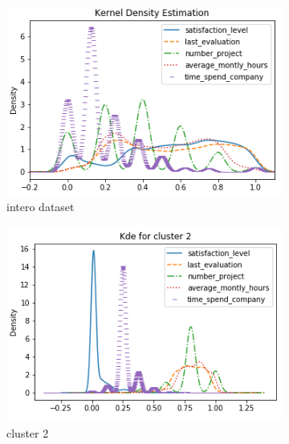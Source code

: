 \documentclass[a4paper]{article}
\begin{document}
\begin{figure}
\centering
\begin{subfigure}[b]{.33\textwidth}
  \centering
  \includegraphics[width=1\textwidth]{kde_quantitative_features.png}
  \caption{intero dataset}
  \label{fig:kde_dataset}
\end{subfigure}%
\begin{subfigure}[b]{.33\textwidth}
  \centering
  \includegraphics[width=1\textwidth]{../images/kde_within_clusters_c2.png}
  \caption{cluster 2}
  \label{fig:kde_2}
\end{subfigure}
\begin{subfigure}[b]{.33\textwidth}
  \centering

\end{subfigure}
\end{figure}
\end{document}

